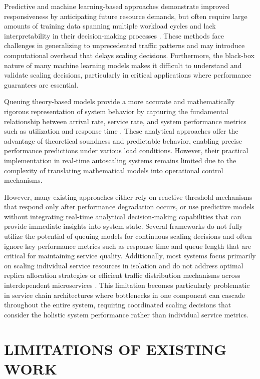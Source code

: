 Predictive and machine learning-based approaches demonstrate improved responsiveness by anticipating future resource demands, but often require large amounts of training data spanning multiple workload cycles and lack interpretability in their decision-making processes \cite{wang2024}. These methods face challenges in generalizing to unprecedented traffic patterns and may introduce computational overhead that delays scaling decisions. Furthermore, the black-box nature of many machine learning models makes it difficult to understand and validate scaling decisions, particularly in critical applications where performance guarantees are essential.

Queuing theory-based models provide a more accurate and mathematically rigorous representation of system behavior by capturing the fundamental relationship between arrival rate, service rate, and system performance metrics such as utilization and response time \cite{lai2025}. These analytical approaches offer the advantage of theoretical soundness and predictable behavior, enabling precise performance predictions under various load conditions. However, their practical implementation in real-time autoscaling systems remains limited due to the complexity of translating mathematical models into operational control mechanisms.

However, many existing approaches either rely on reactive threshold mechanisms that respond only after performance degradation occurs, or use predictive models without integrating real-time analytical decision-making capabilities that can provide immediate insights into system state. Several frameworks do not fully utilize the potential of queuing models for continuous scaling decisions and often ignore key performance metrics such as response time and queue length that are critical for maintaining service quality. Additionally, most systems focus primarily on scaling individual service resources in isolation and do not address optimal replica allocation strategies or efficient traffic distribution mechanisms across interdependent microservices \cite{arulmary2026}. This limitation becomes particularly problematic in service chain architectures where bottlenecks in one component can cascade throughout the entire system, requiring coordinated scaling decisions that consider the holistic system performance rather than individual service metrics.

\section{LIMITATIONS OF EXISTING WORK}

